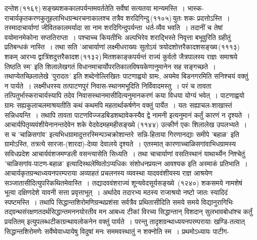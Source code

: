 \documentclass[11pt, openany]{book}
\begin{document}
\newpage

\begin{sloppypar}
\noindent दन्तेश\textendash \,(११६९)\textendash \,सङ्ख्यशककालपर्यन्तमवर्ततेति सर्वेषां सत्यतया मान्यमस्ति~। भास्क-राचार्यकृतकरणकुतूहलाभिधग्रन्थरचनाकालश्च तत्रैव शरदिगिन्दु\textendash \,(११०५)\textendash \,युतः शकः प्रदत्तोऽस्ति~। तस्मादाचार्याणां जीवितकालमर्यादा सा नाम शरदिगिन्दुपर्यन्ता~धर्त-व्यैव भवति~। तदानीं च तेषां वयोमानमेकोना सप्ततिराप्ता~। पश्चाच्च कियतीभिः अल्पभिरेव शराद्भिस्ते निवृत्ता बभूवुरिति ग्रहीतुं प्रतिबन्धकं नास्ति~। तथा सति 'आचार्याणां लक्ष्मीधराख्यः सुतोऽयं त्रयोदशोत्तरैकादशसङ्ख्य\textendash \,(१११३)\textendash \,शकम् आरभ्य द्वात्रिंशदुत्तरैकादश\textendash \,(११३२)\textendash \,मितशकाङ्कपर्यन्तं राज्यं कुर्वतो जैत्रपालस्य राज्ञः समाश्रये तिष्ठति स्म' इति शिलालेखगतं विधानमाचार्योपरतिकालविषयकेणानुमानेन सह सङ्गच्छते~। तथाप्येतच्छिलालेखे 'पुरादतः' इति शब्देनोल्लिखितः पाटणाह्वयो ग्रामः, अयमेव बिडनगरमिति सनिश्चयं वक्तुं न पार्यते~। लक्ष्मीधरस्य तत्पाटणपुरं निवास-स्थानमभूदिति निर्विवादमस्तु~। परं च तावता तत्पितुर्भास्कराचार्यस्यापि तदेव निवासस्थानमासीदित्यनुमानकरणं कया विधया योग्यं भवेत्~। पाटणाह्वयो ग्रामः सह्यकुलाचलमाश्रयतीति कथं कथमपि महतार्थाकर्षणेन वक्तुं पार्येत~। यतः सह्याचल-शाखास्तं सन्निधयन्ति~। तथापि तावता पाटणविज्जडबिडशब्दावेकस्यैव द्वे नामनी इत्यनुमानं कर्तुं कारणं न दृश्यते~।\\

आचार्यपितृव्यवंशीयेनानन्तदेवेन शके वेदवेदमहमहीसङ्ख्ये (११४४) उत्कीर्ण एकः शिलालेख उपलभ्यते~। स च 'चाळिसगांव' इत्यभिधग्रामादुत्तरस्मिन्पञ्चक्रोशान्तरे~सन्नि-हिताया गिरणानद्याः समीपे 'बहाळ' इति ग्रामोऽस्ति, तत्रत्ये सारजा-(शारदा)-देव्या देवालये दृश्यते~। एतस्मात् कारणाच्चाळिसगांवाभिधग्रामस्य सविधप्रदेश आचार्यवंशजमण्डली वसन्त्यासेति सिध्यति~। तथा चाचार्याणां वसतिस्थानं याथार्थ्येन निश्चेतुं 'चाळिसगांव-पाटण-बहाळ' इत्यादिस्थलेष्वितोऽप्यधिकः संशोधनप्रयत्न आवश्यक इति अस्माकं प्रतिभाति~।\\

आचार्यकृतग्रन्थाध्ययनपरम्पराया अव्याहतं प्रचलनस्य व्यवस्था यादववंशीयस्य राज्ञ आश्रयेण सञ्जातासीदित्युपरिकथितमेवास्ति~। तद्यादववंशराज्यं शून्यवेदसूर्यसङ्ख्ये~(१२४०) शकसमये नामशेषं भूत्वा दक्षिणदेशे यावनी सत्ता प्रवृत्ताभूत्~। अर्थादेव तदारभ्य मठस्य राजाश्रयो नष्टो जातः स्यादिदं स्पष्टमस्ति~। तथापि सिद्धान्तशिरोमणिग्रन्थप्रशंसा सर्वत्रैव प्रथितासीदिति समये समये विद्यानुरागिभिः तद्ग्रन्थसंरक्षणतदर्थसिद्धान्तमननयोरतीव मन आबध्य टीकां विरच्य सिद्धान्तान् विशदान् सुलभावबोधांश्च कर्तुं प्रयतितम् इत्युपलब्धटीकाग्रन्थावलोकनेन वक्तुं पार्यते~। परन्तु तादृशग्रन्थाध्ययनपरम्परायाः खण्डि-तत्वात् सिद्धान्तशिरोमणेः सर्वेष्वेवाध्यायेषु विदुषां मनः सममवस्थातुं न शक्नोति स्म~। प्रथमोऽध्यायः पाटीग-
\end{sloppypar}
\end{document}
